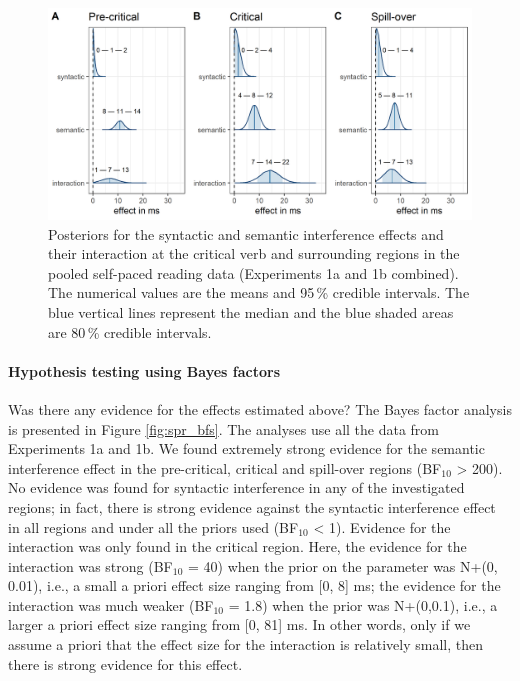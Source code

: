 \documentclass[a4paper, man, floatsintext]{apa7}
\begin{document}
\begin{figure}[H]
    \caption{Posteriors for the syntactic and semantic interference effects and their interaction at the critical verb and surrounding regions in the pooled self-paced reading data (Experiments 1a and 1b combined). The numerical values are the means and 95\,\% credible intervals. The blue vertical lines represent the median and the blue shaded areas are 80\,\% credible intervals.}
    \label{fig:spr_posteriors}
    \centering
    \includegraphics[width=\textwidth]{images/posteriors_spr_pooled_774.png}
\end{figure}

\paragraph{Hypothesis testing using Bayes factors}

Was there any evidence for the effects estimated above? The Bayes factor analysis is presented in Figure \ref{fig:spr_bfs}. The analyses use all the data from Experiments 1a and 1b. We found extremely strong evidence for the semantic interference effect in the pre-critical, critical and spill-over regions (BF$_{10}$ > 200). No evidence was found for syntactic interference in any of the investigated regions; in fact, there is strong evidence against the syntactic interference effect in all regions and under all the priors used (BF$_{10}$ < 1).  Evidence for the interaction was only found in the critical region. Here, the evidence for the interaction was strong (BF$_{10}$ = 40) when the prior on the parameter was N+(0, 0.01), i.e., a small a priori effect size ranging from  [0, 8] ms; the evidence for the interaction was much weaker (BF$_{10}$ = 1.8) when the prior was N+(0,0.1), i.e., a larger a priori effect size ranging from [0, 81] ms. In other words, only if we assume a priori that the effect size for the interaction is relatively small, then there is strong evidence for this effect.
\end{document}
